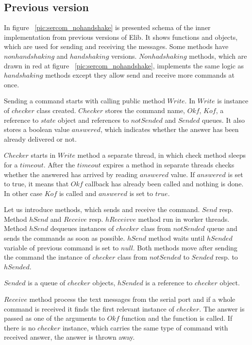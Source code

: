 \subsection*{Previous version}\label{previous}
	In  figure ~\ref{pic:sercom_nohandshake} is presented schema of the inner implementation 
	from previous versions of Elib.
	It shows functions and objects, which are used for sending and receiving the messages.
	Some methods have $nonhandshaking$ and $handshaking$ versions.
	$Nonhadshaking$ methods, which are drawn in red	at figure ~\ref{pic:sercom_nohandshake}, implements the same logic as $handshaking$ methods except they allow send and receive more commands
	at once.

	
	Sending a command starts with calling public method $Write$. In $Write$ is instance of $checker$ class created.
	$Checker$ stores the command name, $Okf$, $Kof$, a reference to $state$ object and references to $notSended$ 
	and $Sended$ queues.
	It also stores a boolean value $answered$, which indicates whether the answer has been already delivered or not.

	$Checker$ starts in $Write$ method a separate thread, in which check method sleeps for a $timeout$.
	After the $timeout$ expires a method in separate threads checks whether the answered has arrived
	by reading $answered$ value. If $answered$ is set to true, it means that $Okf$ callback has already been 
	called and nothing is done. In other case $Kof$ is called and $answered$ is set to $true$.

	Let us introduce methods, which sends and receive the command.
	$Send$ resp.  Method $hSend$ and $Receive$ resp. $hReceivve$ method run in worker threads. 
	Method $hSend$ dequeues instances of $checker$ class from $notSended$ queue and
	sends the commands as soon as possible. $hSend$ method waits until $hSended$ variable
	of previous command is set to $null$. Both methods move after sending the command the instance
	of $checker$ class from $notSended$ to $Sended$ resp. to $hSended$.

	$Sended$ is a queue of $checker$ objects, $hSended$ is a reference to $checker$ object. 
	
	\label{p:oneargument}
	$Receive$ method process the text messages from the serial port and if a whole command is received
	it finds the first relevant instance of  $checker$.
	The answer is passed as one of the arguments to $Okf$ function and the function is called.
	If there is no $checker$ instance, which carries the same type of command with received answer,
	the answer is thrown away.


